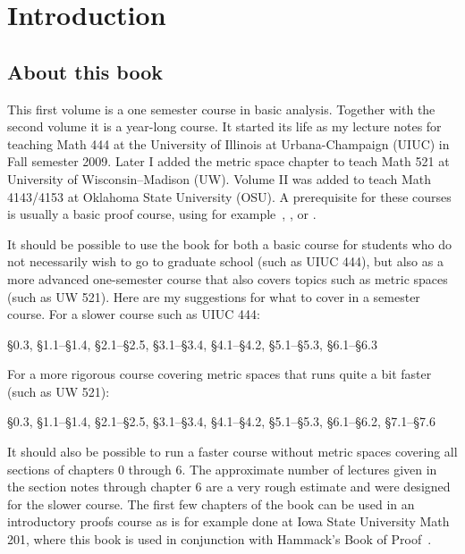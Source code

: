 \chapter*{Introduction}


\section{About this book}

\VolOneIntroExtrahead

This first volume is a one semester course in basic analysis.
Together with the second volume it is a year-long course.
It started its life
as my lecture notes for teaching Math 444 at the
University of Illinois at Urbana-Champaign (UIUC) in Fall semester 2009.
Later I added the metric space chapter to teach Math 521 at University of
Wisconsin--Madison (UW)\@.
Volume II was added to teach Math 4143/4153 at Oklahoma State University
(OSU)\@.
A prerequisite for these courses is usually a basic proof course,
using 
for example~\cite{Hammack}, \cite{GIAM}, or \cite{DW}.

It should be possible to use the book for
both a basic course for students who do not necessarily wish to
go to graduate school (such as UIUC 444), but also as a more advanced one-semester
course that also covers topics such as metric spaces (such as UW 521).
Here are my suggestions for what to cover in a semester course.  For a
slower course such as UIUC 444:
\begin{center}
\S0.3, \S1.1--\S1.4, \S2.1--\S2.5, \S3.1--\S3.4, \S4.1--\S4.2,
\S5.1--\S5.3, \S6.1--\S6.3
\end{center}
For a more rigorous course covering metric spaces that runs quite a bit faster
(such as UW 521):
\begin{center}
\S0.3, \S1.1--\S1.4, \S2.1--\S2.5, \S3.1--\S3.4, \S4.1--\S4.2,
\S5.1--\S5.3, \S6.1--\S6.2, \S7.1--\S7.6
\end{center}
It should also be possible to run a faster course without metric spaces
covering all sections of chapters 0 through 6.  The approximate number of
lectures given in the section notes through chapter 6 are a very rough
estimate and were designed for the slower course.
The first few chapters of the book can be used in an introductory proofs
course as is for example done at Iowa State University Math 201, where 
this book is used in conjunction with Hammack's Book of Proof~\cite{Hammack}.

